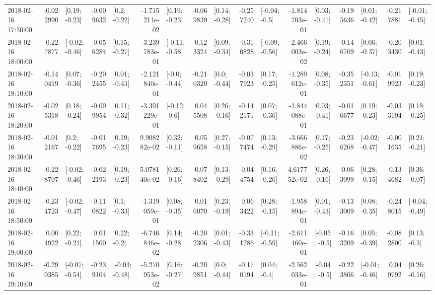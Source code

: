 \begin{tabular}{lrlrlrlrlrlrlrlrl}
2018-02-16 17:50:00 & -0.022990 &   [0.19; -0.23] & -0.009632 &    [0.2; -0.22] & -1.715211e-02 &   [0.19; -0.23] & -0.069839 &   [0.14; -0.28] & -0.257240 &   [-0.04; -0.5] & -1.814703e-01 &   [0.03; -0.41] & -0.195636 &   [0.01; -0.42] & -0.217881 &  [-0.01; -0.45] \\
2018-02-16 18:00:00 & -0.227877 &  [-0.02; -0.46] & -0.056284 &   [0.15; -0.27] & -3.239783e-01 &  [-0.11; -0.58] & -0.123324 &   [0.09; -0.34] & -0.310828 &  [-0.09; -0.56] & -2.466003e-02 &   [0.19; -0.24] & -0.146709 &   [0.06; -0.37] & -0.203430 &   [0.01; -0.43] \\
2018-02-16 18:10:00 & -0.140419 &   [0.07; -0.36] & -0.202455 &   [0.01; -0.43] & -2.121840e-01 &   [-0.0; -0.44] & -0.210320 &    [0.0; -0.44] & -0.037923 &   [0.17; -0.25] & -1.289612e-01 &   [0.08; -0.35] & -0.352351 &  [-0.13; -0.61] & -0.019923 &   [0.19; -0.23] \\
2018-02-16 18:20:00 & -0.025318 &   [0.18; -0.24] & -0.099954 &   [0.11; -0.32] & -3.391229e-01 &   [-0.12; -0.6] &  0.045508 &   [0.26; -0.16] & -0.142171 &   [0.07; -0.36] & -1.844088e-01 &   [0.03; -0.41] & -0.016677 &   [0.19; -0.23] & -0.033194 &   [0.18; -0.25] \\
2018-02-16 18:30:00 & -0.012167 &    [0.2; -0.22] & -0.017695 &   [0.19; -0.23] &  9.908282e-02 &   [0.32; -0.11] &  0.059658 &   [0.27; -0.15] & -0.077474 &   [0.13; -0.29] & -3.666886e-02 &   [0.17; -0.25] & -0.236268 &  [-0.02; -0.47] & -0.001635 &   [0.21; -0.21] \\
2018-02-16 18:40:00 & -0.228707 &  [-0.02; -0.46] & -0.022193 &   [0.19; -0.23] &  5.078140e-02 &   [0.26; -0.16] & -0.078402 &   [0.13; -0.29] & -0.044754 &   [0.16; -0.26] &  4.617752e-02 &   [0.26; -0.16] &  0.063099 &   [0.28; -0.15] &  0.134682 &   [0.36; -0.07] \\
2018-02-16 18:50:00 & -0.234723 &  [-0.02; -0.47] & -0.110822 &    [0.1; -0.33] & -1.319059e-01 &   [0.08; -0.35] &  0.016070 &   [0.23; -0.19] &  0.063422 &   [0.28; -0.15] & -1.958894e-01 &   [0.01; -0.43] & -0.133009 &   [0.08; -0.35] & -0.248015 &  [-0.04; -0.49] \\
2018-02-16 19:00:00 &  0.004922 &   [0.22; -0.21] &  0.011500 &    [0.22; -0.2] & -6.746846e-02 &   [0.14; -0.28] & -0.202306 &   [0.01; -0.43] & -0.331286 &  [-0.11; -0.59] & -2.611460e-01 &   [-0.05; -0.5] & -0.163209 &   [0.05; -0.39] & -0.082800 &    [0.13; -0.3] \\
2018-02-16 19:10:00 & -0.290385 &  [-0.07; -0.54] & -0.239104 &  [-0.03; -0.48] & -5.270953e-02 &   [0.16; -0.27] & -0.209851 &    [0.0; -0.44] & -0.170194 &    [0.04; -0.4] & -2.562033e-01 &   [-0.04; -0.5] & -0.223806 &  [-0.01; -0.46] &  0.049792 &   [0.26; -0.16] \\

\end{tabular}
